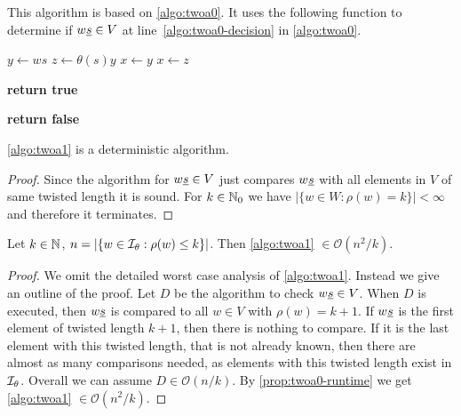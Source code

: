 \begin{algo}[TWOA1]
	This algorithm is based on \ref{algo:twoa0}. It uses the following function to determine if $w \underline{s} \in V$ at line~\ref{algo:twoa0-decision} in \ref{algo:twoa0}.

	\begin{algorithmic}[1]
		\State $y \gets ws$
		\State $z \gets \theta(s)y$
		 
			\State $x \gets y$
		\Else
			\State $x \gets z$
		\EndIf
		
		 \label{algo:twoa1-comp} 
			 
				\State \textbf{return true}
			\EndIf
		\EndFor
		
		\State \textbf{return false}
	\EndProcedure
	\end{algorithmic}
\end{algo}

\begin{lemm}
	\ref{algo:twoa1} is a deterministic algorithm.

	\begin{proof}
		Since the algorithm for $w \underline{s} \in V$ just compares $w \underline{s}$ with all elements in $V$ of same twisted length it is sound. For $k \in \mathbb{N}_0$ we have $|\{ w \in W : \rho(w) = k \}| < \infty$ and therefore it terminates.
	\end{proof}
\end{lemm}

\begin{lemm}
	Let $k \in \mathbb{N}$, $n = |\{ w \in \mathcal{I}_{\theta} : \rho(w) \leq k \}|$. Then \ref{algo:twoa1} $\in \mathcal{O}(n^2/k)$.

	\begin{proof}
		We omit the detailed worst case analysis of \ref{algo:twoa1}. Instead we give an outline of the proof. Let $D$ be the algorithm to check $w \underline{s} \in V$. When $D$ is executed, then $w \underline{s}$ is compared to all $w \in V$ with $\rho(w) = k+1$. If $w \underline{s}$ is the first element of twisted length $k + 1$, then there is nothing to compare. If it is the last element with this twisted length, that is not already known, then there are almost as many comparisons needed, as elements with this twisted length exist in $\mathcal{I}_{\theta}$. Overall we can assume $D \in \mathcal{O}(n/k)$. By \ref{prop:twoa0-runtime} we get \ref{algo:twoa1} $\in \mathcal{O}(n^2/k)$.
	\end{proof}
\end{lemm}

